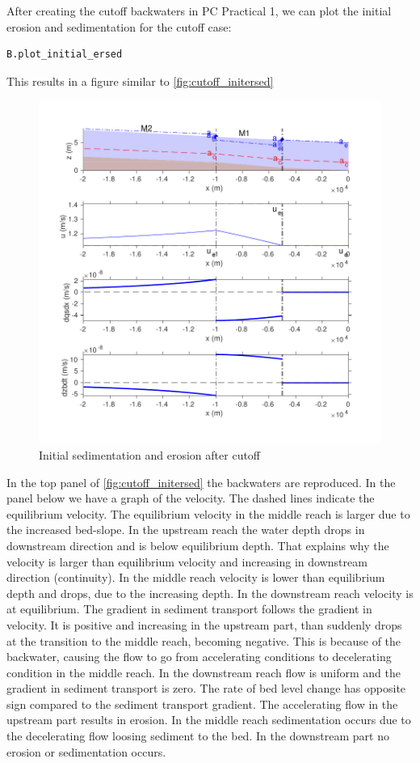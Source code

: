 \documentclass[a4paper]{article}
\begin{document}
\begin{solution}
After creating the cutoff backwaters in PC Practical 1, we can plot the initial erosion and sedimentation for the cutoff case:
\begin{lstlisting}
B.plot_initial_ersed
\end{lstlisting}
This results in a figure similar to \autoref{fig:cutoff_initersed}
\begin{figure}
    \centering
    \includegraphics[width=\linewidth]{matlab/cutoff_initersed.pdf}
    \caption{Initial sedimentation and erosion after cutoff}
    \label{fig:cutoff_initersed}
\end{figure}
In the top panel of \autoref{fig:cutoff_initersed} the backwaters are reproduced. In the panel below we have a graph of the velocity. The dashed lines indicate the equilibrium velocity. The equilibrium velocity in the middle reach is larger due to the increased bed-slope. In the upstream reach the water depth drops in downstream direction and is below equilibrium depth. That explains why the velocity is larger than equilibrium velocity and increasing in downstream direction (continuity). In the middle reach velocity is lower than equilibrium depth and drops, due to the increasing depth. In the downstream reach velocity is at equilibrium.
The gradient in sediment transport follows the gradient in velocity. It is positive and increasing in the upstream part, than suddenly drops at the transition to the middle reach, becoming negative. This is because of the backwater, causing the flow to go from accelerating conditions to decelerating condition in the middle reach. In the downstream reach flow is uniform and the gradient in sediment transport is zero.
The rate of bed level change has opposite sign compared to the sediment transport gradient. The accelerating flow in the upstream part results in erosion. In the middle reach sedimentation occurs due to the decelerating flow loosing sediment to the bed. In the downstream part no erosion or sedimentation occurs.
\end{solution}
\end{document}
